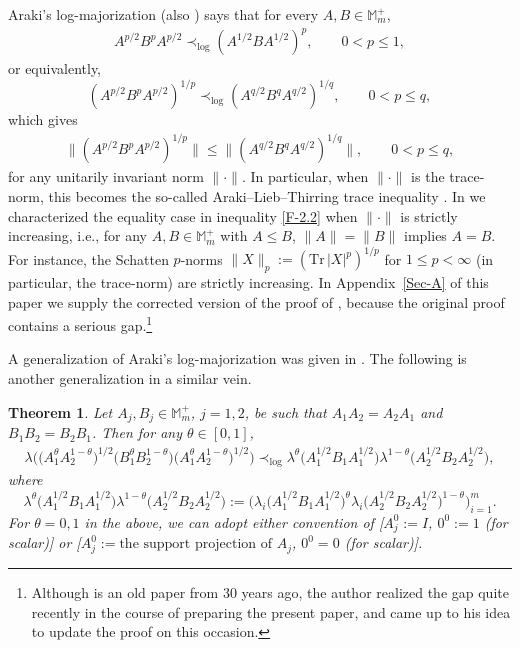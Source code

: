 \documentclass[11pt,reqno]{article}
\newtheorem{theorem}{Theorem}[section]
\numberwithin{equation}{section}
\def\bM{\mathbb{M}}
\def\Tr{\mathrm{Tr}}
\begin{document}
Araki's log-majorization \cite{Ar} (also \cite[Theorem A]{AH}) says that for every $A,B\in\bM_m^+$,
\begin{align}\label{F-2.1}
A^{p/2}B^pA^{p/2}\prec_{\log}(A^{1/2}BA^{1/2})^p,\qquad0<p\le1,
\end{align}
or equivalently,
\[
(A^{p/2}B^pA^{p/2})^{1/p}\prec_{\log}(A^{q/2}B^qA^{q/2})^{1/q},\qquad0<p\le q,
\]
which gives
\begin{align}\label{F-2.2}
\big\|(A^{p/2}B^pA^{p/2})^{1/p}\big\|\le\big\|(A^{q/2}B^qA^{q/2})^{1/q}\big\|,\qquad0<p\le q,
\end{align}
for any unitarily invariant norm $\|\cdot\|$. In particular, when $\|\cdot\|$ is the trace-norm, this becomes the
so-called Araki--Lieb--Thirring trace inequality \cite{Ar}. In \cite[Theorem 2.1]{Hi} we characterized the equality
case in inequality \eqref{F-2.2} when $\|\cdot\|$ is strictly increasing, i.e., for any $A,B\in\bM_m^+$ with
$A\le B$, $\|A\|=\|B\|$ implies $A=B$. For instance, the Schatten $p$-norms
$\|X\|_p:=(\Tr\,|X|^p)^{1/p}$ for $1\le p<\infty$ (in particular, the trace-norm) are
strictly increasing. In Appendix~\ref{Sec-A} of this paper we supply the corrected version of the proof of
\cite[Theorem 2.1]{Hi}, because the original proof contains a serious gap.\footnote{
Although \cite{Hi} is an old paper from 30 years ago, the author realized the gap quite recently in the course
of preparing the present paper, and came up to his idea to update the proof on this occasion.}

A generalization of Araki's log-majorization was given in \cite{Hi2}. The following is another generalization in a
similar vein.

\begin{theorem}\label{T-2.1}
Let $A_j,B_j\in\bM_m^+$, $j=1,2$, be such that $A_1A_2=A_2A_1$ and $B_1B_2=B_2B_1$. Then for any
$\theta\in[0,1]$,
\begin{align}\label{F-2.3}
\lambda\bigl(\bigl(A_1^\theta A_2^{1-\theta}\bigr)^{1/2}\bigl(B_1^\theta B_2^{1-\theta}\bigr)
\bigl(A_1^\theta A_2^{1-\theta}\bigr)^{1/2}\bigr)
\prec_{\log}\lambda^\theta\bigl(A_1^{1/2}B_1A_1^{1/2}\bigr)
\lambda^{1-\theta}\bigl(A_2^{1/2}B_2A_2^{1/2}\bigr),
\end{align}
where
\[
\lambda^\theta\bigl(A_1^{1/2}B_1A_1^{1/2}\bigr)\lambda^{1-\theta}\bigl(A_2^{1/2}B_2A_2^{1/2}\bigr)
:=\bigl(\lambda_i\bigl(A_1^{1/2}B_1A_1^{1/2}\bigr)^\theta
\lambda_i\bigl(A_2^{1/2}B_2A_2^{1/2}\bigr)^{1-\theta}\bigr)_{i=1}^m.
\]
For $\theta=0,1$ in the above, we can adopt either convention of [$A_j^0:=I$, $0^0:=1$ (for scalar)] or
[$A_j^0:=\mbox{the support projection of $A_j$}$, $0^0=0$ (for scalar)].
\end{theorem}
\end{document}

